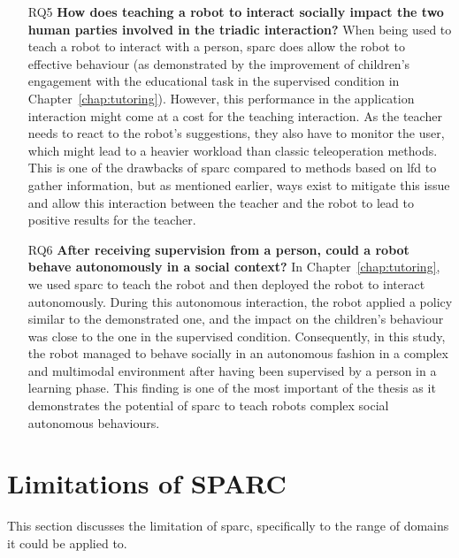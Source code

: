 \begin{itemize}
	\item [RQ5] \textbf{How does teaching a robot to interact socially impact the two human parties involved in the triadic interaction?}
	When being used to teach a robot to interact with a person, \gls{sparc} does allow the robot to effective behaviour (as demonstrated by the improvement of children's engagement with the educational task in the supervised condition in Chapter~\ref{chap:tutoring}). However, this performance in the application interaction might come at a cost for the teaching interaction. As the teacher needs to react to the robot's suggestions, they also have to monitor the user, which might lead to a heavier workload than classic teleoperation methods. This is one of the drawbacks of \gls{sparc} compared to methods based on \gls{lfd} to gather information, but as mentioned earlier, ways exist to mitigate this issue and allow this interaction between the teacher and the robot to lead to positive results for the teacher.
	
	\item [RQ6] \textbf{After receiving supervision from a person, could a robot behave autonomously in a social context?}
	In Chapter~\ref{chap:tutoring}, we used \gls{sparc} to teach the robot and then deployed the robot to interact autonomously. During this autonomous interaction, the robot applied a policy similar to the demonstrated one, and the impact on the children's behaviour was close to the one in the supervised condition. Consequently, in this study, the robot managed to behave socially in an autonomous fashion in a complex and multimodal environment after having been supervised by a person in a learning phase. This finding is one of the most important of the thesis as it demonstrates the potential of \gls{sparc} to teach robots complex social autonomous behaviours.
\end{itemize}

\section{Limitations of SPARC} \label{sec:disc_limitations}

This section discusses the limitation of \gls{sparc}, specifically to the range of domains it could be applied to.

